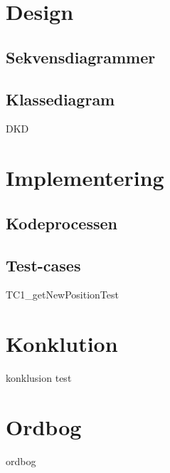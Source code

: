 \documentclass{article}
\begin{document}
{\newpage
\section{Design}

\subsection{Sekvensdiagrammer}

\newpage
\subsection{Klassediagram}
{DKD}

\section{Implementering}
\subsection{Kodeprocessen}

\subsection{Test-cases}
{TC1_getNewPositionTest}



\section{Konklution}
{konklusion}
test

\newpage
\section*{Ordbog}

{ordbog}




\newpage
\cleardoublepage
\printbibliography[heading=bibintoc]
}
\end{document}
